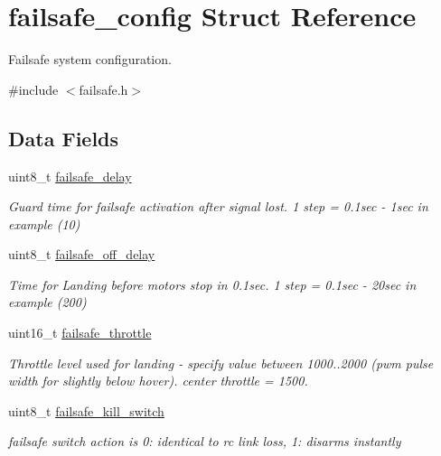 \hypertarget{structfailsafe__config}{\section{failsafe\+\_\+config Struct Reference}
\label{structfailsafe__config}
}


Failsafe system configuration.  




{\ttfamily \#include $<$failsafe.\+h$>$}

\subsection*{Data Fields}
\begin{DoxyCompactItemize}
\item 
uint8\+\_\+t \hyperlink{structfailsafe__config_aa73617bb85906499adcb93edcf820815}{failsafe\+\_\+delay}
\begin{DoxyCompactList}\small\item\em Guard time for failsafe activation after signal lost. 1 step = 0.\+1sec -\/ 1sec in example (10) \end{DoxyCompactList}\item 
uint8\+\_\+t \hyperlink{structfailsafe__config_a9a5a37eebe4d6a20430161f34b63ecac}{failsafe\+\_\+off\+\_\+delay}
\begin{DoxyCompactList}\small\item\em Time for Landing before motors stop in 0.\+1sec. 1 step = 0.\+1sec -\/ 20sec in example (200) \end{DoxyCompactList}\item 
uint16\+\_\+t \hyperlink{structfailsafe__config_a4fab4c40b0b4a56e36b46d32b0a1da14}{failsafe\+\_\+throttle}
\begin{DoxyCompactList}\small\item\em Throttle level used for landing -\/ specify value between 1000..2000 (pwm pulse width for slightly below hover). center throttle = 1500. \end{DoxyCompactList}\item 
uint8\+\_\+t \hyperlink{structfailsafe__config_a01e9c5d32a5c3c42d1702ddcd0775d41}{failsafe\+\_\+kill\+\_\+switch}
\begin{DoxyCompactList}\small\item\em failsafe switch action is 0\+: identical to rc link loss, 1\+: disarms instantly \end{DoxyCompactList}\item 

\end{DoxyCompactItemize}

